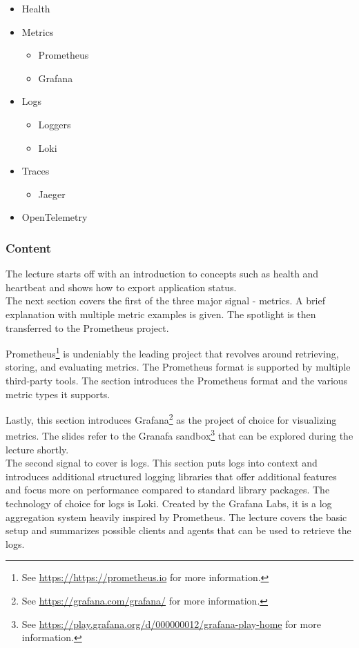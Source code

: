 \documentclass[
  digital,
  color,
  oneside,
  nosansbold,
  nocolorbold,
  lof,
  lot,
]{fithesis4}
\begin{document}
\begin{itemize}
    \item Health
    \item Metrics
    \begin{itemize}
        \item Prometheus
        \item Grafana
    \end{itemize}
    \item Logs
    \begin{itemize}
        \item Loggers
        \item Loki
    \end{itemize}
    \item Traces
    \begin{itemize}
        \item Jaeger
    \end{itemize}
    \item OpenTelemetry
\end{itemize}

\subsubsection{Content}

The lecture starts off with an introduction to concepts such as health and heartbeat and shows how to export application status. \\

The next section covers the first of the three major signal - metrics. A brief explanation with multiple metric examples is given. The spotlight is then transferred to the Prometheus project.

Prometheus\footnote{See \url{https://https://prometheus.io} for more information.}
is undeniably the leading project that revolves around retrieving, storing, and evaluating metrics. The Prometheus format is supported by multiple third-party tools. The section introduces the Prometheus format and the various metric types it supports.

Lastly, this section introduces Grafana\footnote{See \url{https://grafana.com/grafana/} for more information.}
as the project of choice for visualizing metrics. The slides refer to the Granafa sandbox\footnote{See \url{https://play.grafana.org/d/000000012/grafana-play-home} for more information.}
that can be explored during the lecture shortly. \\

The second signal to cover is logs. This section puts logs into context and introduces additional structured logging libraries that offer additional features and focus more on performance compared to standard library packages.
The technology of choice for logs is Loki. Created by the Grafana Labs, it is a log aggregation system heavily inspired by Prometheus. The lecture covers the basic setup and summarizes possible clients and agents that can be used to retrieve the logs. \\
\end{document}
